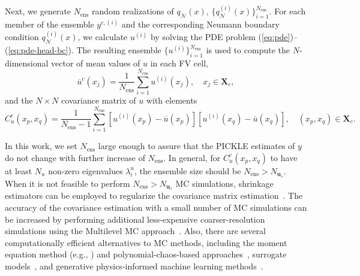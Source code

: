 \documentclass{agujournal2019}
\begin{document}
Next, we generate $N_{\text{ens}}$ random realizations of $q_\mathcal{N}(x)$, $\{ q_\mathcal{N}^{(i)}(x) \}^{N_{\mathrm{ens}}}_{i = 1}$.  
%
For each member of the ensemble $ y^{c,(i)}$ and the corresponding Neumann boundary condition $q_\mathcal{N}^{(i)}(x)$, we calculate $u^{(i)}$ by solving the PDE problem (\ref{eq:pde})--(\ref{eq:pde-head-bc}).
The resulting ensemble $\{ u^{(i)} \}^{N_{\mathrm{ens}}}_{i = 1}$ is used to compute the $N$-dimensional vector of mean values of $u$ in each FV cell,
%
\begin{equation}
  \label{eq:ens_mean}
  \overline{u}^c(x_j) = \frac{1}{N_{\mathrm{ens}}} \sum_{i=1}^{N_{\mathrm{ens}}} u^{(i)}(x_j),\quad x_j\in\mathbf{X}_c,
\end{equation}
and the $N \times N$ covariance matrix of $u$ with elements
%
\begin{equation}
  \label{eq:ens_covariance}
  C^c_u(x_p,x_q) = \frac{1}{N_{\mathrm{ens}} - 1} \sum_{i=1}^{N_{\mathrm{ens}}} \left [ u^{(i)}(x_p) - \overline{u}(x_p) \right ] \left [ u^{(i)}(x_q) - \overline{u}(x_q) \right ], \quad(x_p,x_q)\in\mathbf{X}_c.
\end{equation}
%


In this work, we set  $N_{\mathrm{ens}}$ large enough to assure that the PICKLE estimates of $y$ do not change with further increase of $N_{\mathrm{ens}}$. 
In general, for $C^c_u(x_p,x_q)$ to have at least $N_u$ non-zero eigenvalues $\lambda_i^u$, the ensemble size should be $N_{\mathrm{ens}} > N_{\mathbf{u}_s}$. 
%
When it is not feasible to perform $N_{\mathrm{ens}} > N_{\mathbf{u}_s}$ MC simulations, shrinkage estimators can be employed to regularize the covariance matrix estimation~\citep{chen_2009_shrinkage}.
The accuracy of the covariance estimation with a small number of MC simulations can be increased by performing additional less-expensive coarser-resolution simulations using the Multilevel MC approach~\citep{giles-2015-multilevel,yang2018physics,Yang2019JCP}.
Also, there are several computationally efficient alternatives to MC methods, including the moment equation method (e.g., \citep{neuman1993eulerian,Tart2003JH,Jarman2013JUQ}) and polynomial-chaos-based approaches~\citep{Lin2010JSC,Tipireddy2020JCP,LI2020JCP}, surrogate models~\citep{YangJUQ2018}, and generative physics-informed machine learning methods~\citep{yang2019highly}. 
\end{document}
